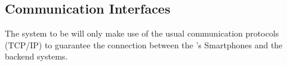 \documentclass[../../../rasd.tex]{subfiles}
\begin{document}
\subsection{Communication Interfaces\label{sect:3.1.4}}


The system to be will only make use of the usual communication protocols (TCP/IP) to guarantee the connection between the ’s Smartphones and the backend systems.
\end{document}
